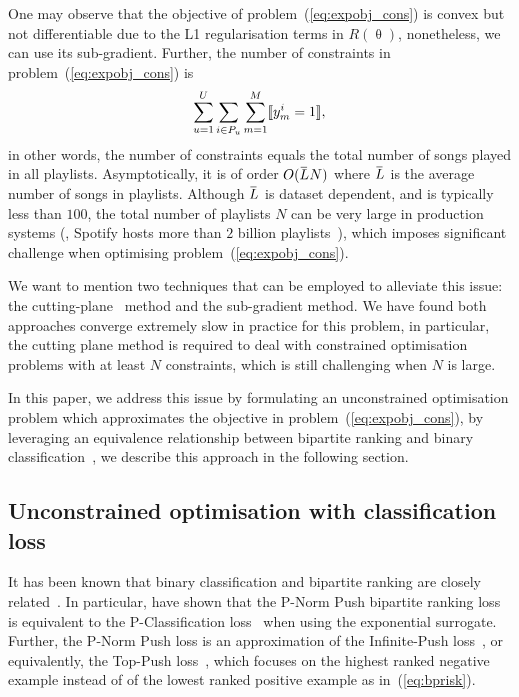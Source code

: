 One may observe that the objective of problem~(\ref{eq:expobj_cons}) is convex but not differentiable due to 
the L1 regularisation terms in $R(\uptheta)$, nonetheless, we can use its sub-gradient.
Further, the number of constraints in problem~(\ref{eq:expobj_cons}) is
$$
\sum_{u=1}^U \sum_{i \in P_u} \sum_{m=1}^M \llbracket y_m^i = 1 \rrbracket,
$$
in other words, the number of constraints equals the total number of songs played in all playlists.
Asymptotically, it is of order $O(\widebar{L} N)$ where $\widebar{L}$ is the average number of songs in playlists.
Although $\widebar{L}$ is dataset dependent, and is typically less than $100$,
the total number of playlists $N$ can be very large in production systems 
(\eg, Spotify hosts more than $2$ billion playlists~\cite{recsysch2018}),
which imposes significant challenge when optimising problem~(\ref{eq:expobj_cons}).

We want to mention two techniques that can be employed to alleviate this issue:
the cutting-plane~\cite{avriel2003nonlinear} method and the sub-gradient method.
We have found both approaches converge extremely slow in practice for this problem, 
in particular, the cutting plane method is required to deal with constrained optimisation problems 
with at least $N$ constraints, which is still challenging when $N$ is large.

In this paper, we address this issue by formulating an unconstrained optimisation problem which approximates 
the objective in problem~(\ref{eq:expobj_cons}), by leveraging an equivalence relationship between bipartite 
ranking and binary classification~\cite{ertekin2011equivalence}, we describe this approach in the following section.




\subsection{Unconstrained optimisation with classification loss}

It has been known that binary classification and bipartite ranking are
closely related~\cite{ertekin2011equivalence,menon2016bipartite}.
In particular, \citet{ertekin2011equivalence} have shown that the P-Norm Push bipartite ranking loss~\cite{rudin2009p}
is equivalent to the P-Classification loss~\cite{ertekin2011equivalence} when using the exponential surrogate.
Further, the P-Norm Push loss is an approximation of the Infinite-Push loss~\cite{agarwal2011infinite},
or equivalently, the Top-Push loss~\cite{li2014top}, which focuses on the highest ranked negative example instead of
of the lowest ranked positive example as in~(\ref{eq:bprisk}).

